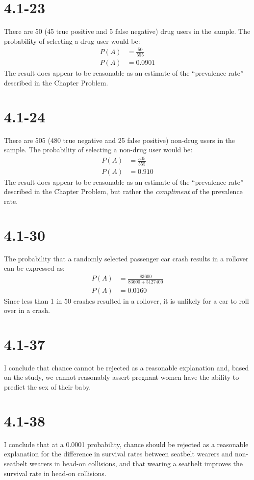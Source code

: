 \documentclass[12pt,fleqn]{article}
\newcommand{\chapter}{4.1}
\newcommand{\problem}[1]{\vspace{5ex}\section*{\chapter-#1}}
\begin{document}
\problem{23}
There are 50 (45 true positive and 5 false negative) drug users in the sample. The probability of selecting a drug user would be:
\begin{align*}
  P(A) &= \frac{50}{555} \\
  P(A) &= 0.0901
\end{align*}
The result does appear to be reasonable as an estimate of the ``prevalence rate'' described in the Chapter Problem.


\problem{24}
There are 505 (480 true negative and 25 false positive) non-drug users in the sample. The probability of selecting a non-drug user would be:
\begin{align*}
  P(A) &= \frac{505}{555} \\
  P(A) &= 0.910
\end{align*}
The result does appear to be reasonable as an estimate of the ``prevalence rate'' described in the Chapter Problem, but rather the \textit{compliment} of the prevalence rate.


\problem{30}
The probability that a randomly selected passenger car crash results in a rollover can be expressed as:
\begin{align*}
  P(A) &= \frac{83600}{83600 + 5127400} \\
  P(A) &= 0.0160
\end{align*}
Since less than 1 in 50 crashes resulted in a rollover, it is unlikely for a car to roll over in a crash.


\problem{37}
I conclude that chance cannot be rejected as a reasonable explanation and, based on the study, we cannot reasonably assert pregnant women have the ability to predict the sex of their baby.


\problem{38}
I conclude that at a 0.0001 probability, chance should be rejected as a reasonable explanation for the difference in survival rates between seatbelt wearers and non-seatbelt wearers in head-on collisions, and that wearing a seatbelt improves the survival rate in head-on collisions.
\end{document}
